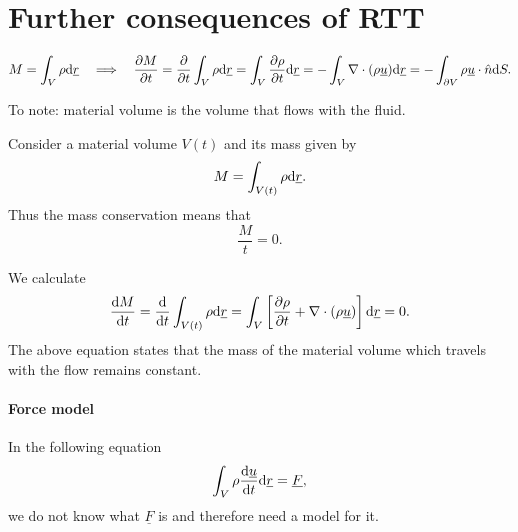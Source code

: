 \documentclass[11pt,oneside]{book}
\renewcommand{\vec}[1]{\underline{#1}}
\theoremstyle{definition} %
\theoremstyle{plain} %
\theoremstyle{remark} %
\theoremstyle{underline}
\begin{document}
  \section{Further consequences of RTT}

  \begin{figure}[ht]
    \centering
  \end{figure}

  
  \begin{displaymath}
    M = \int_V \rho \d \vec r \qLRa \ptf{M}{t} 
    = \ptf{}{t} \int_V \rho \d \vec r 
    = \int_V \ptf{\rho}{t} \d \vec r 
    = - \int_V \nabla \cdot (\rho \vec u) \d \vec r
    = - \int_{\partial V} \rho \vec u \cdot \hat n \d S .
  \end{displaymath}

  To note: material volume is the volume that flows with the fluid.
  

  Consider a material volume $V(t)$ and its mass given by
  \begin{displaymath}
    M = \int_{V(t)}  \rho \d \vec r.
  \end{displaymath}
  Thus the mass conservation means that
  \begin{displaymath}
    \dfrac{M}{t} = 0.
  \end{displaymath}

  We calculate
  \begin{displaymath}
    \dfrac{M}{t} = \dfrac{}{t} \int_{V(t)} \rho \d \vec r 
    = \int_V \left[ \ptf{\rho}{t} + \nabla \cdot (\rho \vec u) \right]\d \vec r 
    = 0.
  \end{displaymath}
  The above equation states that the mass of the material volume which travels with the flow remains constant.
  
  \paragraph{Force model}
  In the following equation
  \begin{displaymath}
    \int_V \rho \dfrac{\vec u}{t} \d \vec r = \vec F,
  \end{displaymath}
  we do not know what $\vec F$ is and therefore need a model for it.
\end{document}
